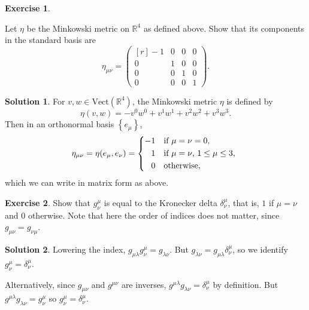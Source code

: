 \documentclass[11pt, a4paper]{report}
\theoremstyle{definition}
\newtheorem{ex}{Exercise}[part]
\newtheorem{sol}{Solution}[part]
\begin{document}
\begin{ex}\label{ex:minkowskimetric}

Let $\eta$ be the Minkowski metric on $\mathbb{R}^4$ as defined above.
Show that its components in the standard basis are
\[
    \eta_{\mu\nu} = \begin{pmatrix*}[r]
            -1 & 0 & 0 & 0 \\
            0 & 1 & 0 & 0 \\
            0 & 0 & 1 & 0 \\
            0 & 0 & 0 & 1
        \end{pmatrix*}.
\]

\end{ex}

\begin{sol}

For $v, w \in \text{Vect}(\mathbb{R}^4)$, the Minkowski metric $\eta$ is defined by
\[
    \eta(v, w) = -v^0 w^0 + v^1 w^1 + v^2 w^2 + v^3 w^3.
\]
Then in an orthonormal basis $\left\{e_\mu\right\}$,
\[
    \eta_{\mu\nu} = \eta(e_\mu, e_\nu) = \begin{dcases*}
            -1            & if $\mu = \nu = 0$, \\ %
            \phantom{-} 1 & if $\mu = \nu$, $1 \leq \mu \leq 3$, \\ %
            \phantom{-} 0 & otherwise,
        \end{dcases*}
\]
which we can write in matrix form as above.

\end{sol}

\begin{ex}

Show that $g^\mu_\nu$ is equal to the Kronecker delta $\delta^\mu_\nu$, that is, $1$ if $\mu = \nu$ and $0$ otherwise. Note that here the order of indices does not matter, since $g_{\mu\nu} = g_{\nu\mu}$.

\end{ex}

\begin{sol}

Lowering the index, $g_{\mu\lambda}g^\mu_\nu = g_{\lambda\nu}$.
But $g_{\lambda\nu} = g_{\mu\lambda}\delta^\mu_\nu$, so we identify $g^\mu_\nu = \delta^\mu_\nu$.

Alternatively, since $g_{\mu\nu}$ and $g^{\mu\nu}$ are inverses, $g^{\mu\lambda} g_{\lambda\nu} = \delta^\mu_\nu$ by definition.
But $g^{\mu\lambda} g_{\lambda\nu} = g^\mu_\nu$ so $g^\mu_\nu = \delta^\mu_\nu$.

\end{sol}
\end{document}
